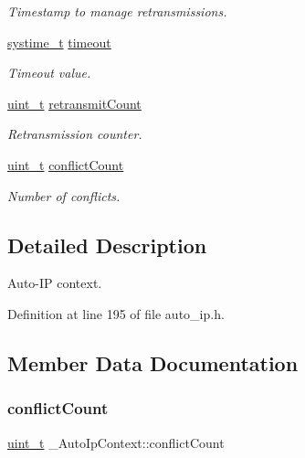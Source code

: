 \begin{DoxyCompactItemize}
\begin{DoxyCompactList}\small\item\em Timestamp to manage retransmissions. \end{DoxyCompactList}\item 
\hyperlink{compiler__port_8h_ae3e32a98d431a02106616da3071832dd}{systime\+\_\+t} \hyperlink{struct__AutoIpContext_abc5126c18c57397b94e847c5c71b563a}{timeout}
\begin{DoxyCompactList}\small\item\em Timeout value. \end{DoxyCompactList}\item 
\hyperlink{compiler__port_8h_a12a1e9b3ce141648783a82445d02b58d}{uint\+\_\+t} \hyperlink{struct__AutoIpContext_ab383a1748a1f93187d8a9ac0a7076e92}{retransmit\+Count}
\begin{DoxyCompactList}\small\item\em Retransmission counter. \end{DoxyCompactList}\item 
\hyperlink{compiler__port_8h_a12a1e9b3ce141648783a82445d02b58d}{uint\+\_\+t} \hyperlink{struct__AutoIpContext_ad431a7285a01bae7accdb982c6b8fc99}{conflict\+Count}
\begin{DoxyCompactList}\small\item\em Number of conflicts. \end{DoxyCompactList}\end{DoxyCompactItemize}


\subsection{Detailed Description}
Auto-\/\+IP context. 

Definition at line 195 of file auto\+\_\+ip.\+h.



\subsection{Member Data Documentation}
\mbox{\label{struct__AutoIpContext_ad431a7285a01bae7accdb982c6b8fc99}} 
\subsubsection{\texorpdfstring{conflict\+Count}{conflictCount}}
{\footnotesize\ttfamily \hyperlink{compiler__port_8h_a12a1e9b3ce141648783a82445d02b58d}{uint\+\_\+t} \+\_\+\+Auto\+Ip\+Context\+::conflict\+Count}



